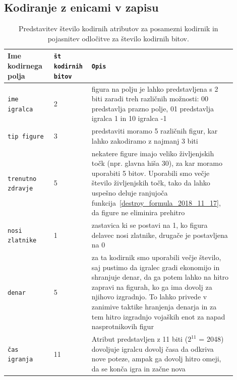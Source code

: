 \documentclass[a4paper, 12pt]{book}
\begin{document}
\subsection{Kodiranje z enicami v zapisu}
\label{oneHotEncoder}
\begin{table}
	\begin{center}
		\begin{tabular}{p{0.19\linewidth}|p{0.13\linewidth}|p{0.58\linewidth}}
			Ime kodirnega polja      & {\tt št kodirnih bitov} & {\tt Opis} \\ \hline
			{\tt ime igralca}        & 2                       & figura na polju je lahko predstavljena s 2 biti zaradi treh različnih možnosti: 00 predstavlja prazno polje, 01 predstavlja igralca 1 in 10 igralca -1 \\
			{\tt tip figure}         & 3                       & predstaviti moramo 5 različnih figur, kar lahko zakodiramo z najmanj 3 biti\\
			{\tt trenutno zdravje}   & 5                       & nekatere figure imajo veliko življenjskih točk (npr. glavna hiša 30), za kar moramo uporabiti 5 bitov. 
																 Uporabili smo večje število življenjskih točk, tako da lahko uspešno deluje ranjujoča funkcija~\ref{destroy_formula_2018_11_17}, da figure ne eliminira prehitro \\
			{\tt nosi zlatnike}      & 1                       & zastavica ki se postavi na 1, ko figura delavec nosi zlatnike, drugače je postavljena na 0 \\
			{\tt denar}              & 5                       & za ta kodirnik smo uporabili večje število, saj pustimo da igralec gradi ekonomijo in shranjuje denar, da ga potem lahko na hitro zapravi na figurah, ko ga ima dovolj za njihovo izgradnjo.
																 To lahko privede v zanimive taktike hranjenja denarja in za tem hitro izgradnjo vojaških enot za napad nasprotnikovih figur \\
			{\tt čas igranja}        & 11                      & Atribut predstavljen z 11 biti ($2^{11}$ = 2048) dovoljuje igralcu dovolj časa da odkriva nove poteze, ampak ga dovolj hitro omeji, da se konča igra in začne nova \\
		\end{tabular}
	\end{center}
	\caption{Predstavitev število kodirnih atributov za posamezni kodirnik in pojasnitev odločitve za število kodirnih bitov. }
	\label{tableEncodersOneHot}
\end{table}
\end{document}
